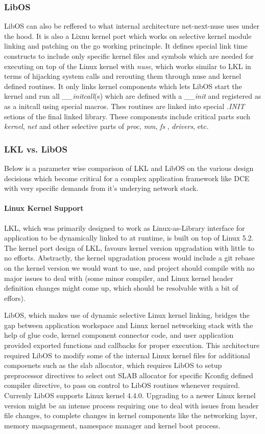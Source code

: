 \documentclass{sig-alternate}
\begin{document}
\subsubsection{LibOS}
LibOS can also be reffered to what internal architecture net-next-nuse uses under the hood. It is also a Lixnu kernel port which works on selective 
kernel module linking and patching on the go working princinple. It defines special link time constructs to include only specific kernel files and 
symbols which are needed for executing on top of the Linux kernel with \textit{nuse}, which works similar to LKL in terms of hijacking system calls 
and rerouting them through nuse and kernel defined routines. It only links kernel components which lets LibOS start the kernel and run all \textit{\_\_initcall}(s)
which are defined with a \textit{\_\_init} and registered as as a initcall using special macros. Thes routines are linked into special \textit{.INIT} 
setions of the final linked library. These components include critical parts such \textit{kernel}, \textit{net} and other selective parts of \textit{proc},
\textit{mm}, \textit{fs} , \textit{drivers}, etc. 

\subsubsection{LKL vs. LibOS}
Below is a parameter wise comparison of LKL and LibOS on the various design decisions which become critical for a complex application framework like 
DCE with very specific demands from it's underying network stack.

\paragraph{Linux Kernel Support}
LKL, which was primarily designed to work as Linux-as-Library interface for application to be dynamically linked to at runtime, is built on top of 
Linux 5.2. The kernel port design of LKL, favours kernel version upgradation with little to no efforts. Abstractly, the kernel upgradation process 
would include a git rebase on the kernel version we would want to use, and project should compile with no major issues to deal with (some minor compiler, 
and Linux kernel header definition changes might come up, which should be resolvable with a bit of effors).

LibOS, which makes use of dynamic selective Linux kernel linking, bridges the gap between application workspace and Linux kernel networking stack with
the help of glue code, kernel component connector code, and user application provided exported functions and callbacks for proper execution. This
architecture required LibOS to modify some of the internal Linux kernel files for additional compoenets such as the slab allocator, which requires 
LibOS to setup preprocessor directives to select out SLAB allocator for specific Kconfig defined compiler directive, to pass on control to LibOS routines 
whenever required. Currenly LibOS supports Linux kernel 4.4.0. Upgrading to a newer Linux kernel version might be an intense process requiring one 
to deal with issues from header file changes, to complete changes in kernel components like the networking layer, memory maqnagement, namespace manager 
and kernel boot process.
\end{document}
